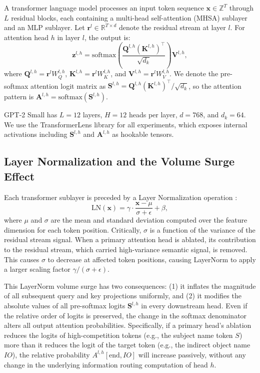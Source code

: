\documentclass[10pt]{article} %
\begin{document}
A transformer language model \citep{vaswani2017attention} processes an input
token sequence $\mathbf{x} \in \mathbb{Z}^T$ through $L$ residual blocks, each
containing a multi-head self-attention (MHSA) sublayer and an MLP sublayer.
Let $\mathbf{r}^l \in \mathbb{R}^{T \times d}$ denote the residual stream at
layer $l$. For attention head $h$ in layer $l$, the output is:
\begin{equation}
  \mathbf{z}^{l,h} = \text{softmax}\!\left(\frac{\mathbf{Q}^{l,h}(\mathbf{K}^{l,h})^\top}{\sqrt{d_k}}\right)\mathbf{V}^{l,h},
  \label{eq:attn}
\end{equation}
where $\mathbf{Q}^{l,h} = \mathbf{r}^l W_Q^{l,h}$, $\mathbf{K}^{l,h} = \mathbf{r}^l W_K^{l,h}$,
and $\mathbf{V}^{l,h} = \mathbf{r}^l W_V^{l,h}$. We denote the
pre-softmax attention logit matrix as
$\mathbf{S}^{l,h} = \mathbf{Q}^{l,h}(\mathbf{K}^{l,h})^\top / \sqrt{d_k}$,
so the attention pattern is $\mathbf{A}^{l,h} = \text{softmax}(\mathbf{S}^{l,h})$.

GPT-2 Small \citep{radford2019language} has $L=12$ layers, $H=12$ heads per
layer, $d=768$, and $d_k=64$. We use the TransformerLens library
\citep{nanda2022transformerlens} for all experiments, which exposes internal
activations including $\mathbf{S}^{l,h}$ and $\mathbf{A}^{l,h}$ as hookable
tensors.

\subsection{Layer Normalization and the Volume Surge Effect}
\label{subsec:layernorm}

Each transformer sublayer is preceded by a Layer Normalization operation
\citep{ba2016layer}:
\begin{equation}
  \text{LN}(\mathbf{x}) = \gamma \cdot \frac{\mathbf{x} - \mu}{\sigma + \epsilon} + \beta,
\end{equation}
where $\mu$ and $\sigma$ are the mean and standard deviation computed over the
feature dimension for each token position. Critically, $\sigma$ is a function of
the variance of the residual stream signal. When a primary attention head is
ablated, its contribution to the residual stream, which carried high-variance
semantic signal, is removed. This causes $\sigma$ to decrease at affected token
positions, causing LayerNorm to apply a larger scaling factor $\gamma/(\sigma+\epsilon)$.

This LayerNorm volume surge has two consequences: (1) it inflates the magnitude
of all subsequent query and key projections uniformly, and (2) it modifies the
absolute values of all pre-softmax logits $\mathbf{S}^{l,h}$ in every downstream
head. Even if the relative order of logits is preserved, the change in the
softmax denominator alters all output attention probabilities. Specifically, if
a primary head's ablation reduces the logits of high-competition tokens
(e.g., the subject name token $S$) more than it reduces the logit of the
target token (e.g., the indirect object name $IO$), the relative probability
$A^{l,h}[\text{end}, IO]$ will increase passively, without any change in the
underlying information routing computation of head $h$.
\end{document}
